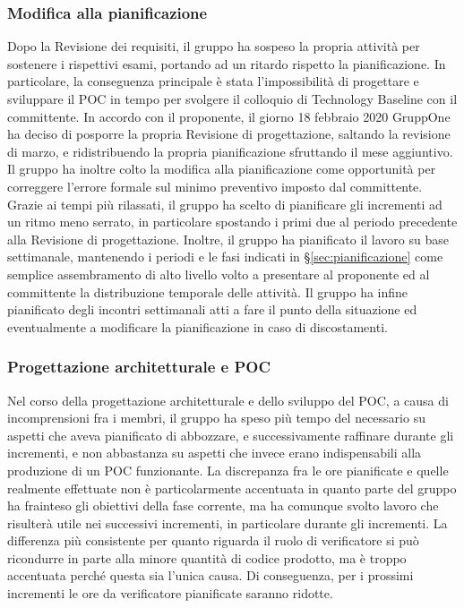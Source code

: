 \documentclass[../piano-di-progetto.tex]{subfiles}
\begin{document}
\subsubsection{Modifica alla pianificazione}%
\label{subs:modifica_alla_pianificazione}

Dopo la Revisione dei requisiti, il gruppo ha sospeso la propria attività per sostenere i rispettivi esami, portando ad un ritardo rispetto la pianificazione.
In particolare, la conseguenza principale è stata l'impossibilità di progettare e sviluppare il POC in tempo per svolgere il colloquio di Technology Baseline con il committente.
In accordo con il proponente, il giorno 18 febbraio 2020 GruppOne ha deciso di posporre la propria Revisione di progettazione, saltando la revisione di marzo, e ridistribuendo la propria pianificazione sfruttando il mese aggiuntivo.
Il gruppo ha inoltre colto la modifica alla pianificazione come opportunità per correggere l'errore formale sul minimo preventivo imposto dal committente.
Grazie ai tempi più rilassati, il gruppo ha scelto di pianificare gli incrementi ad un ritmo meno serrato, in particolare spostando i primi due al periodo precedente alla Revisione di progettazione.
Inoltre, il gruppo ha pianificato il lavoro su base settimanale, mantenendo i periodi e le fasi indicati in §\ref{sec:pianificazione} come semplice assembramento di alto livello volto a presentare al proponente ed al committente la distribuzione temporale delle attività.
Il gruppo ha infine pianificato degli incontri settimanali atti a fare il punto della situazione ed eventualmente a modificare la pianificazione in caso di discostamenti.

\subsubsection{Progettazione architetturale e POC}%
\label{subs:progettazione_architetturale_e_poc}

Nel corso della progettazione architetturale e dello sviluppo del POC, a causa di incomprensioni fra i membri, il gruppo ha speso più tempo del necessario su aspetti che aveva pianificato di abbozzare, e successivamente raffinare durante gli incrementi, e non abbastanza su aspetti che invece erano indispensabili alla produzione di un POC funzionante.
La discrepanza fra le ore pianificate e quelle realmente effettuate non è particolarmente accentuata in quanto parte del gruppo ha frainteso gli obiettivi della fase corrente, ma ha comunque svolto lavoro che risulterà utile nei successivi incrementi, in particolare durante gli incrementi.
La differenza più consistente per quanto riguarda il ruolo di verificatore si può ricondurre in parte alla minore quantità di codice prodotto, ma è troppo accentuata perché questa sia l'unica causa.
Di conseguenza, per i prossimi incrementi le ore da verificatore pianificate saranno ridotte.
\end{document}
